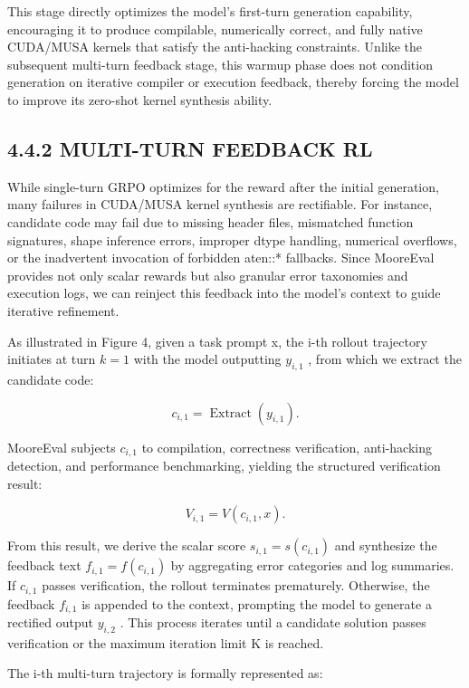 \documentclass[
  10
]{article}
\begin{document}
This stage directly optimizes the model's first-turn generation
capability, encouraging it to produce compilable, numerically correct,
and fully native CUDA/MUSA kernels that satisfy the anti-hacking
constraints. Unlike the subsequent multi-turn feedback stage, this
warmup phase does not condition generation on iterative compiler or
execution feedback, thereby forcing the model to improve its zero-shot
kernel synthesis ability.

\subsection{4.4.2 MULTI-TURN FEEDBACK RL}\label{multi-turn-feedback-rl}

While single-turn GRPO optimizes for the reward after the initial
generation, many failures in CUDA/MUSA kernel synthesis are rectifiable.
For instance, candidate code may fail due to missing header files,
mismatched function signatures, shape inference errors, improper dtype
handling, numerical overflows, or the inadvertent invocation of
forbidden aten::* fallbacks. Since MooreEval provides not only scalar
rewards but also granular error taxonomies and execution logs, we can
reinject this feedback into the model's context to guide iterative
refinement.

As illustrated in Figure 4, given a task prompt x, the i-th rollout
trajectory initiates at turn \(k = 1\) with the model outputting
\(y _ { i , 1 }\) , from which we extract the candidate code:

\[
c _ {i, 1} = \operatorname{Extract} (y _ {i, 1}).\tag{6}
\]

MooreEval subjects \(c _ { i , 1 }\) to compilation, correctness
verification, anti-hacking detection, and performance benchmarking,
yielding the structured verification result:

\[
V _ {i, 1} = V (c _ {i, 1}, x).\tag{7}
\]

From this result, we derive the scalar score
\(s _ { i , 1 } = s ( c _ { i , 1 } )\) and synthesize the feedback text
\(f _ { i , 1 } = f ( c _ { i , 1 } )\) by aggregating error categories
and log summaries. If \(c _ { i , 1 }\) passes verification, the rollout
terminates prematurely. Otherwise, the feedback \(f _ { i , 1 }\) is
appended to the context, prompting the model to generate a rectified
output \(y _ { i , 2 }\) . This process iterates until a candidate
solution passes verification or the maximum iteration limit K is
reached.

The i-th multi-turn trajectory is formally represented as:
\end{document}
